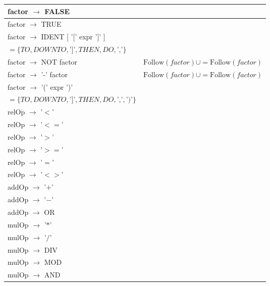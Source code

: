 \documentclass[8pt]{scrartcl}
\newcommand{\First}[1]{\mathrm{First}(#1)}
\newcommand{\Follow}[1]{\mathrm{Follow}(#1)}
\newcommand{\epsset}{\{\varepsilon\}}
\begin{document}
\begin{itemize}
\begin{tabular}{|l|l|}
                \hline
                factor $\rightarrow$ FALSE &\\
                \hline
                factor $\rightarrow$ TRUE &\\
                \hline
                factor $\rightarrow$ IDENT [ '[' expr ']' ] & \makecell[l]{$\Follow{expr} \cup = \First{\text{']'}} \setminus \epsset $\\$= \{TO, DOWNTO, \text{']'}, THEN, DO, \text{','}\}$} \\
                \hline
                factor $\rightarrow$ NOT factor & $\Follow{factor} \cup = \Follow{factor}$\\
                \hline
                factor $\rightarrow$ '-' factor & $\Follow{factor} \cup = \Follow{factor}$\\
                \hline
                factor $\rightarrow$ '(' expr ')' & \makecell[l]{$\Follow{expr} \cup = \First{\text{'$)$'}} \setminus \epsset $\\ $= \{TO, DOWNTO, \text{']'}, THEN, DO, \text{','}, \text{'$)$'}\}$}\\
                \hline
                relOp $\rightarrow$ '$<$' & \\
                \hline
                relOp $\rightarrow$ '$<=$' & \\
                \hline
                relOp $\rightarrow$ '$>$' & \\
                \hline
                relOp $\rightarrow$ '$>=$' & \\
                \hline
                relOp $\rightarrow$ '$=$' & \\
                \hline
                relOp $\rightarrow$ '$<>$' & \\
                \hline
                addOp $\rightarrow$ '$+$' & \\
                \hline
                addOp $\rightarrow$ '$-$' & \\
                \hline
                addOp $\rightarrow$ OR & \\
                \hline
                mulOp $\rightarrow$ '$*$' & \\
                \hline
                mulOp $\rightarrow$ '$/$' & \\
                \hline
                mulOp $\rightarrow$ DIV & \\
                \hline
                mulOp $\rightarrow$ MOD & \\
                \hline
                mulOp $\rightarrow$ AND & \\
                \end{tabular}
        \end{itemize}
\end{document}
